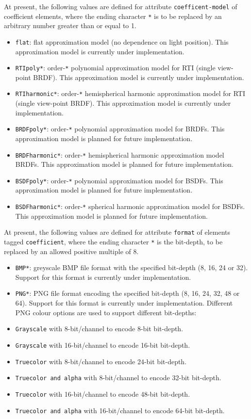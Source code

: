 At present, the following values are defined for attribute
\texttt{coefficent-model} of coefficient elements, where the ending character
\texttt{*} is to be replaced by an arbitrary number greater than or
equal to 1.
\begin{itemize}
\item \texttt{flat}: flat approximation model (no dependence on
light position). This approximation model is currently under
implementation.
\item \texttt{RTIpoly*}: order-\texttt{*} polynomial
approximation model for RTI (single view-point BRDF). This approximation
model is currently under implementation.
\item \texttt{RTIharmonic*}:
order-\texttt{*} hemispherical harmonic approximation model for RTI
(single view-point BRDF). This approximation model is currently under
implementation.
\item \texttt{BRDFpoly*}: order-\texttt{*} polynomial
approximation model for BRDFs. This approximation model is planned for
future implementation.
\item \texttt{BRDFharmonic*}: order-\texttt{*}
hemispherical harmonic approximation model BRDFs. This approximation
model is planned for future implementation.
\item \texttt{BSDFpoly*}:
order-\texttt{*} polynomial approximation model for BSDFs. This
approximation model is planned for future implementation.
\item \texttt{BSDFharmonic*}: order-\texttt{*} spherical harmonic
approximation model for BSDFs. This approximation model is planned for
future implementation.
\end{itemize}

At present, the following values are defined for attribute
\texttt{format} of elements tagged \texttt{coefficient}, where the
ending character \texttt{*} is the bit-depth, to be replaced by an
allowed positive multiple of 8.
\begin{itemize}
\item \texttt{BMP*}: greyscale BMP file
format with the specified bit-depth (8, 16, 24 or 32). Support for this
format is currently under implementation.
\item \texttt{PNG*}: PNG file
format encoding the specified bit-depth (8, 16, 24, 32, 48 or 64).
Support for this format is currently under implementation. Different PNG
colour options are used to support different bit-depths:
\item \texttt{Grayscale} with 8-bit/channel to encode 8-bit bit-depth.
\item \texttt{Grayscale} with 16-bit/channel to encode 16-bit bit-depth.
\item \texttt{Truecolor} with 8-bit/channel to encode 24-bit bit-depth.
\item \texttt{Truecolor\ and\ alpha} with 8-bit/channel to encode 32-bit
bit-depth.
\item \texttt{Truecolor} with 16-bit/channel to encode 48-bit
bit-depth.
\item \texttt{Truecolor\ and\ alpha} with 16-bit/channel to
encode 64-bit bit-depth.
\end{itemize}

